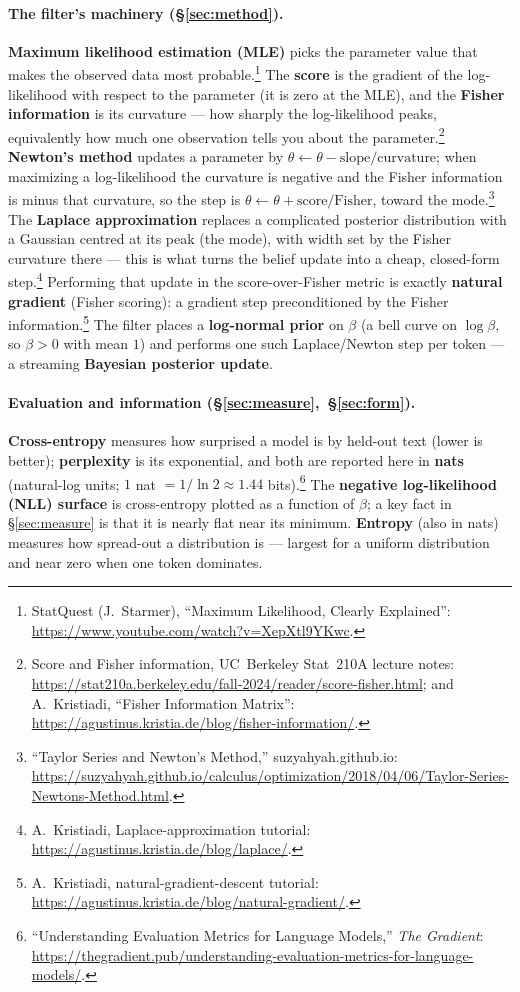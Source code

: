 \documentclass[11pt]{article}
\begin{document}
\paragraph{The filter's machinery (\S\ref{sec:method}).}
\textbf{Maximum likelihood estimation (MLE)} picks the parameter value that makes
the observed data most probable.\footnote{StatQuest (J.~Starmer), ``Maximum
Likelihood, Clearly Explained'': \url{https://www.youtube.com/watch?v=XepXtl9YKwc}.}
The \textbf{score} is the gradient of the log-likelihood with respect to the
parameter (it is zero at the MLE), and the \textbf{Fisher information} is its
curvature --- how sharply the log-likelihood peaks, equivalently how much one
observation tells you about the parameter.\footnote{Score and Fisher information,
UC~Berkeley Stat~210A lecture notes:
\url{https://stat210a.berkeley.edu/fall-2024/reader/score-fisher.html}; and
A.~Kristiadi, ``Fisher Information Matrix'':
\url{https://agustinus.kristia.de/blog/fisher-information/}.}
\textbf{Newton's method} updates a parameter by $\theta \leftarrow \theta -
\text{slope}/\text{curvature}$; when maximizing a log-likelihood the curvature is
negative and the Fisher information is minus that curvature, so the step is
$\theta \leftarrow \theta + \text{score}/\text{Fisher}$, toward the mode.\footnote{``Taylor Series
and Newton's Method,'' suzyahyah.github.io:
\url{https://suzyahyah.github.io/calculus/optimization/2018/04/06/Taylor-Series-Newtons-Method.html}.}
The \textbf{Laplace approximation} replaces a complicated posterior distribution
with a Gaussian centred at its peak (the mode), with width set by the Fisher
curvature there --- this is what turns the belief update into a cheap, closed-form
step.\footnote{A.~Kristiadi, Laplace-approximation tutorial:
\url{https://agustinus.kristia.de/blog/laplace/}.} Performing that update in the
score-over-Fisher metric is exactly \textbf{natural gradient} (Fisher scoring): a
gradient step preconditioned by the Fisher information.\footnote{A.~Kristiadi,
natural-gradient-descent tutorial:
\url{https://agustinus.kristia.de/blog/natural-gradient/}.} The filter places a
\textbf{log-normal prior} on $\beta$ (a bell curve on $\log\beta$, so $\beta>0$
with mean $1$) and performs one such Laplace/Newton step per token --- a streaming
\textbf{Bayesian posterior update}.

\paragraph{Evaluation and information (\S\ref{sec:measure},~\S\ref{sec:form}).}
\textbf{Cross-entropy} measures how surprised a model is by held-out text (lower is
better); \textbf{perplexity} is its exponential, and both are reported here in
\textbf{nats} (natural-log units; $1$ nat $=1/\!\ln 2 \approx 1.44$
bits).\footnote{``Understanding Evaluation Metrics for Language Models,'' \emph{The
Gradient}:
\url{https://thegradient.pub/understanding-evaluation-metrics-for-language-models/}.}
The \textbf{negative log-likelihood (NLL) surface} is cross-entropy plotted as a
function of $\beta$; a key fact in \S\ref{sec:measure} is that it is nearly flat
near its minimum. \textbf{Entropy} (also in nats) measures how spread-out a
distribution is --- largest for a uniform distribution and near zero when one token
dominates.
\end{document}

